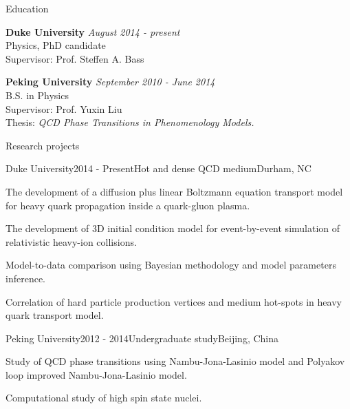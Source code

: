 \documentclass{resume} %
\begin{document}

\begin{rSection}{Education}

{\bf Duke University} \hfill {\em August 2014 - present} \\ 
Physics, PhD candidate \\
Supervisor: Prof. Steffen A. Bass

{\bf Peking University} \hfill {\em September 2010 - June 2014} \\ 
B.S. in Physics \\
Supervisor: Prof. Yuxin Liu \\
Thesis: { \it QCD Phase Transitions in Phenomenology Models. }

\end{rSection}


\begin{rSection}{Research projects}

\begin{rSubsection}{Duke University}{2014 - Present}{Hot and dense QCD medium}{Durham, NC}
\item The development of a diffusion plus linear Boltzmann equation transport model for heavy quark propagation inside a quark-gluon plasma.
\item The development of 3D initial condition model for event-by-event simulation of relativistic heavy-ion collisions.
\item Model-to-data comparison using Bayesian methodology and model parameters inference.
\item Correlation of hard particle production vertices and medium hot-spots in heavy quark transport model.


\end{rSubsection}
\begin{rSubsection}{Peking University}{2012 - 2014}{Undergraduate study}{Beijing, China}
\item Study of QCD phase transitions using Nambu-Jona-Lasinio model and Polyakov loop improved Nambu-Jona-Lasinio model.
\item Computational study of high spin state nuclei.
\end{rSubsection}

\end{rSection}
\end{document}
